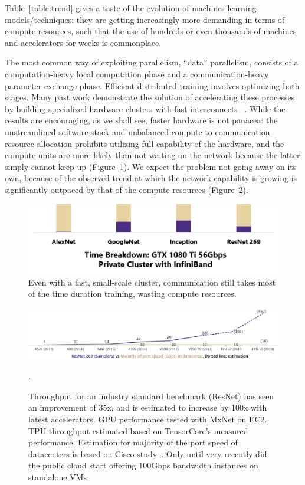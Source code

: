 Table~\ref{table:trend} gives a taste of the evolution of machines learning models/techniques: they are getting increasingly more demanding in terms of compute resources, such that the use of hundreds or even thousands of machines and accelerators for weeks is commonplace. 




The most common way of exploiting parallelism, ``data'' parallelism, consists of a computation-heavy local computation phase and a communication-heavy parameter exchange phase. Efficient distributed training involves optimizing both stages. Many past work demonstrate the solution of accelerating these processes by building specialized hardware clusters with fast interconnects ~\cite{DBLP:journals/corr/abs-1711-00489, You:2018:ITM:3225058.3225069, DBLP:journals/corr/abs-1711-04325,jia2018highly,DBLP:journals/corr/abs-1811-05233,sun2019optimizing, ImageNetIn1Hour, firecaffe, phubsocc}. While the results are encouraging, as we shall see, faster hardware is not panacea: the unstreamlined software stack and unbalanced compute to communication resource allocation prohibits utilizing full capability of the hardware, and the compute units are more likely than not waiting on the network because the latter simply cannot keep up (Figure~\ref{fig:clusterOverhead}). We expect the problem not going away on its own, because of the observed trend at which the network capability is growing is significantly outpaced by that of the compute resources (Figure~\ref{fig:accthroughput}).  


\begin{figure}
	\centering
	\includegraphics[width=.5\linewidth, trim=6 1 3 3,clip]{Figures/clusteroverhead.png}
	\caption{Even with a fast, small-scale cluster, communication still takes most of the time duration training, wasting compute resources.}
	\label{fig:clusterOverhead}
\end{figure}

\begin{figure}
	\centering
	\includegraphics[width=\linewidth, trim=2 3 3 3,clip]{Figures/computevscomm.png}
	\caption{Throughput for an industry standard benchmark (ResNet) has seen an improvement of 35x, and is estimated to increase by 100x with latest accelerators. GPU performance tested with MxNet on EC2. TPU throughput estimated based on TensorCore's measured performance. Estimation for majority of the port speed of datacenters is based on Cisco study~\cite{CISCOMarket}. Only until very recently did the public cloud start offering 100Gbps bandwidth instances on standalone VMs~\cite{Introduc9:online, NewC5nIn6:online}}.
	\label{fig:accthroughput}
\end{figure}

